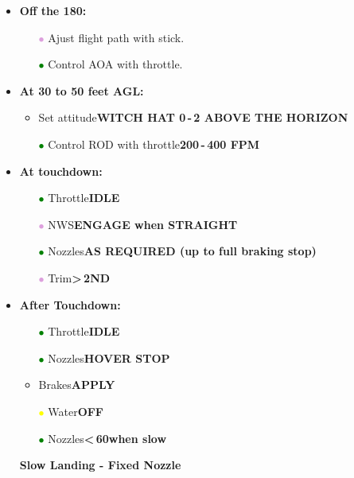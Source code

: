\documentclass[a4paper,12pt,dvipsnames]{letter}
\newcommand{\button}[1]{\textbf{#1}}
\newcommand{\Deg}{\textdegree{}}
\newcommand{\gi}{\textcolor{Green}{$\bullet$\;}}
\newcommand{\yi}{\textcolor{Yellow}{$\bullet$\;}}
\newcommand{\vi}{\textcolor{Plum}{$\bullet$\;}}
\begin{document}
{\begin{itemize}
\begin{itemize}
 \item[\gi] Nozzles\dotfill\button{60\Deg}
 \item[\yi] Flaps\dotfill\button{CHECK PROG and DROOP}
 \item AOA\dotfill\button{10\Deg\,-\,12\Deg}
\end{itemize}
\item \button{Off the 180:}
\begin{itemize}
 \item[\vi] Ajust flight path with stick.
 \item[\gi] Control AOA with throttle.
\end{itemize}
\item \button{At 30 to 50 feet AGL:}
\begin{itemize}
 \item Set attitude\dotfill\button{WITCH HAT 0\Deg\,-\,2\Deg{} ABOVE THE HORIZON}
 \item[\gi] Control ROD with throttle\dotfill\button{200\,-\,400 FPM}
\end{itemize}
\item \button{At touchdown:}
\begin{itemize}
 \item[\gi] Throttle\dotfill\button{IDLE}
 \item[\vi] NWS\dotfill\button{ENGAGE when STRAIGHT}
 \item[\gi] Nozzles\dotfill\button{AS REQUIRED (up to full braking stop)}
 \item[\vi] Trim\dotfill\button{>\,2\Deg\;ND}
\end{itemize}
\item \button{After Touchdown:}
\begin{itemize}
\item[\gi] Throttle\dotfill\button{IDLE}
\item[\gi] Nozzles\dotfill\button{HOVER STOP}
\item Brakes\dotfill\button{APPLY}
\item[\yi] Water\dotfill\button{OFF}
\item[\gi] Nozzles\dotfill\button{<\,60\Deg\;when slow}
\end{itemize}
\end{itemize}
\newpage
\begin{itemize}
 \item[] {\LARGE\textbf{Slow Landing - Fixed Nozzle}}

\end{itemize}}
\end{document}
